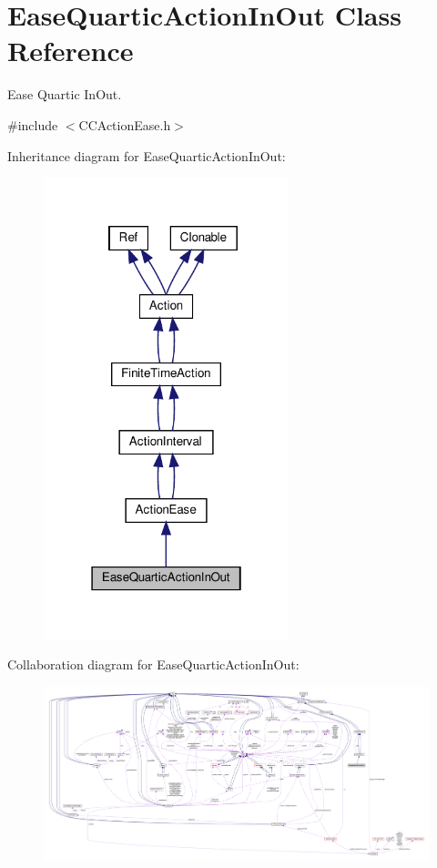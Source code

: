 \hypertarget{classEaseQuarticActionInOut}{}\section{Ease\+Quartic\+Action\+In\+Out Class Reference}
\label{classEaseQuarticActionInOut}


Ease Quartic In\+Out.  




{\ttfamily \#include $<$C\+C\+Action\+Ease.\+h$>$}



Inheritance diagram for Ease\+Quartic\+Action\+In\+Out\+:
\nopagebreak
\begin{figure}[H]
\begin{center}
\leavevmode
\includegraphics[width=202pt]{classEaseQuarticActionInOut__inherit__graph}
\end{center}
\end{figure}


Collaboration diagram for Ease\+Quartic\+Action\+In\+Out\+:
\nopagebreak
\begin{figure}[H]
\begin{center}
\leavevmode
\includegraphics[width=350pt]{classEaseQuarticActionInOut__coll__graph}
\end{center}
\end{figure}
